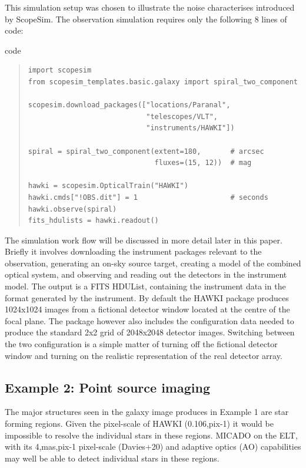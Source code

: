 This simulation setup was chosen to illustrate the noise characterises introduced by ScopeSim.
The observation simulation requires only the following 8 lines of code:

\label{code-example-1-galaxy}
\begin{DUclass}{code}
\begin{quote}
\begin{alltt}
\begin{lstlisting}[frame=single]
import scopesim
from scopesim_templates.basic.galaxy import spiral_two_component

scopesim.download_packages(["locations/Paranal",
                            "telescopes/VLT",
                            "instruments/HAWKI"])

spiral = spiral_two_component(extent=180,       # arcsec
                              fluxes=(15, 12))  # mag

hawki = scopesim.OpticalTrain("HAWKI")
hawki.cmds["!OBS.dit"] = 1                      # seconds
hawki.observe(spiral)
fits_hdulists = hawki.readout()
\end{lstlisting}
\end{alltt}
\end{quote}
\end{DUclass}

The simulation work flow will be discussed in more detail later in this paper.
Briefly it involves downloading the instrument packages relevant to the observation, generating an on-sky source target, creating a model of the combined optical system, and observing and reading out the detectors in the instrument model.
The output is a FITS HDUList, containing the instrument data in the format generated by the instrument.
By default the HAWKI package produces 1024x1024 images from a fictional detector window located at the centre of the focal plane.
The package however also includes the configuration data needed to produce the standard 2x2 grid of 2048x2048 detector images.
Switching between the two configuration is a simple matter of turning off the fictional detector window and turning on the realistic representation of the real detector array.


\subsection{Example 2: Point source imaging%
  \label{example-2-point-source-imaging}%
}

The major structures seen in the galaxy image produces in Example 1 are star forming regions.
Given the pixel-scale of HAWKI (0.106\textquotedbl{},pix-1) it would be impossible to resolve the individual stars in these regions.
MICADO on the ELT, with its 4,mas,pix-1 pixel-scale (Davies+20) and adaptive optics (AO) capabilities may well be able to detect individual stars in these regions.

